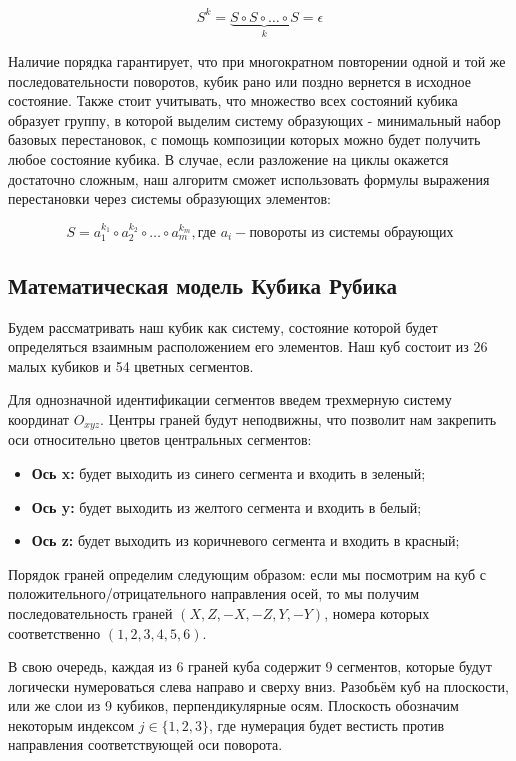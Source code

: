 \documentclass{article}
\begin{document}
\begin{equation}
S^k = \underbrace{S \circ S \circ \dots \circ S}_{k} = \epsilon
\end{equation}

Наличие порядка гарантирует, что при многократном повторении одной и той же последовательности поворотов, кубик рано или поздно вернется в исходное состояние. Также стоит учитывать, что множество всех состояний кубика образует группу, в которой выделим систему образующих - минимальный набор базовых перестановок, с помощь композиции которых можно будет получить любое состояние кубика. В случае, если разложение на циклы окажется достаточно сложным, наш алгоритм сможет использовать формулы выражения перестановки через системы образующих элементов:

\begin{equation}
S = a_1^{k_1} \circ a_2^{k_2} \circ \dots \circ a_m^{k_m}, \text{где } a_{i} - \text{повороты из системы обраующих}
\end{equation}

\subsection{Математическая модель Кубика Рубика}
Будем рассматривать наш кубик как систему, состояние которой будет определяться взаимным расположением его элементов. Наш куб состоит из 26 малых кубиков и 54 цветных сегментов.

Для однозначной идентификации сегментов введем трехмерную систему координат $O_{xyz}$. Центры граней будут неподвижны, что позволит нам закрепить оси относительно цветов центральных сегментов:
\begin{itemize}
\item\textbf{Ось x:} будет выходить из синего сегмента и входить в зеленый;
\item\textbf{Ось y:} будет выходить из желтого сегмента и входить в белый;
\item\textbf{Ось z:} будет выходить из коричневого сегмента и входить в красный;
\end{itemize}

Порядок граней определим следующим образом: если мы посмотрим на куб с положительного/отрицательного направления осей, то мы получим последовательность граней $(X, Z, -X, -Z, Y, -Y)$, номера которых соответственно $(1, 2, 3, 4, 5, 6)$.

В свою очередь, каждая из 6 граней куба содержит 9 сегментов, которые будут логически нумероваться слева направо и сверху вниз. Разобьём куб на плоскости, или же слои из 9 кубиков, перпендикулярные осям. Плоскость обозначим некоторым индексом $j\in\{1, 2, 3\}$, где нумерация будет вестисть против направления соответствующей оси поворота.
\end{document}
